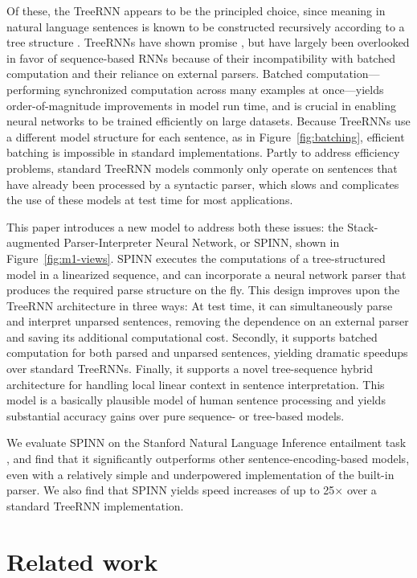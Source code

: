 \documentclass[11pt]{article}
\begin{document}
Of these, the TreeRNN appears to be the principled choice, since meaning in natural language sentences is known to be constructed recursively according to a tree structure \citep[][i.a.]{Dowty07DC}. TreeRNNs have shown promise \citep{tai2015improved,li2015tree,bowman2015trees}, but have largely been overlooked in favor of sequence-based RNNs because of their incompatibility with batched computation and their reliance on external parsers.  Batched computation---performing synchronized computation across many examples at once---yields order-of-magnitude improvements in model run time, and is crucial in enabling neural networks to be trained efficiently on large datasets. Because TreeRNNs use a different model structure for each sentence, as in Figure~\ref{fig:batching}, efficient batching is impossible in standard implementations. Partly to address efficiency problems, standard TreeRNN models commonly only operate on sentences that have already been processed by a syntactic parser, which slows and complicates the use of these models at test time for most applications.

This paper introduces a new model to address both these issues: the Stack-augmented Parser-Interpreter Neural Network, or SPINN, shown in Figure~\ref{fig:m1-views}. SPINN executes the computations of a tree-structured model in a linearized sequence, and can incorporate a neural network parser that produces the required parse structure on the fly. This design improves upon the TreeRNN architecture in three ways: At test time, it can simultaneously parse and interpret unparsed sentences, removing the dependence on an external parser and saving its additional computational cost. Secondly, it supports batched computation for both parsed and unparsed sentences, yielding dramatic speedups over standard TreeRNNs. Finally, it supports a novel tree-sequence hybrid architecture for handling local linear context in sentence interpretation. This model is a basically plausible model of human sentence processing and yields substantial accuracy gains over pure sequence- or tree-based models. %

We evaluate SPINN on the Stanford Natural Language Inference entailment task \citep[SNLI,][]{snli:emnlp2015}, and find that it significantly outperforms other sentence-encoding-based models, even with a relatively simple and underpowered implementation of the built-in parser. We also find that SPINN yields speed increases of up to 25$\times$ over a standard TreeRNN implementation.

\section{Related work}
\end{document}
